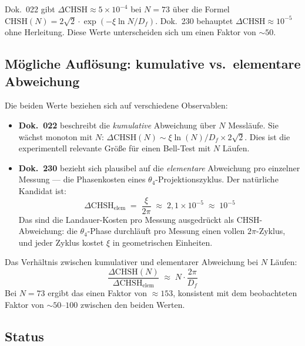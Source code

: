 Dok.~022 gibt $\Delta\text{CHSH} \approx 5\times10^{-4}$ bei $N=73$
über die Formel $\text{CHSH}(N) = 2\sqrt{2}\cdot\exp(-\xi\ln N/D_f)$.
Dok.~230 behauptet $\Delta\text{CHSH} \approx 10^{-5}$ ohne Herleitung.
Diese Werte unterscheiden sich um einen Faktor von $\sim50$.

\subsection*{Mögliche Auflösung: kumulative vs.\ elementare Abweichung}

Die beiden Werte beziehen sich auf verschiedene Observablen:

\begin{itemize}
  \item \textbf{Dok.~022} beschreibt die \emph{kumulative} Abweichung
        über $N$ Messläufe. Sie wächst monoton mit $N$:
        $\Delta\text{CHSH}(N) \sim \xi\ln(N)/D_f \times 2\sqrt{2}$.
        Dies ist die experimentell relevante Größe für einen Bell-Test
        mit $N$ Läufen.

  \item \textbf{Dok.~230} bezieht sich plausibel auf die
        \emph{elementare} Abweichung pro einzelner Messung — die
        Phasenkosten eines $\theta_4$-Projektionszyklus. Der natürliche
        Kandidat ist:
        \begin{equation}
          \Delta\text{CHSH}_\text{elem}
          \;=\; \frac{\xi}{2\pi}
          \;\approx\; 2{,}1\times10^{-5}
          \;\approx\; 10^{-5}
          \tag{190.21}
        \end{equation}
        Das sind die Landauer-Kosten pro Messung ausgedrückt als
        CHSH-Abweichung: die $\theta_4$-Phase durchläuft pro Messung
        einen vollen $2\pi$-Zyklus, und jeder Zyklus kostet $\xi$
        in geometrischen Einheiten.
\end{itemize}

Das Verhältnis zwischen kumulativer und elementarer Abweichung bei $N$ Läufen:
\begin{equation}
  \frac{\Delta\text{CHSH}(N)}{\Delta\text{CHSH}_\text{elem}}
  \;\approx\; N\cdot\frac{2\pi}{D_f}
  \tag{190.22}
\end{equation}
Bei $N=73$ ergibt das einen Faktor von $\approx 153$, konsistent mit
dem beobachteten Faktor von $\sim50$--$100$ zwischen den beiden Werten.

\subsection*{Status}

